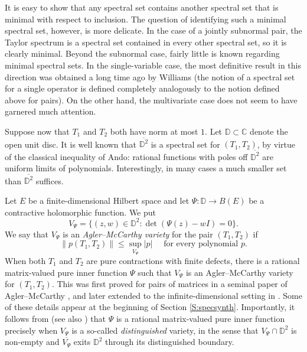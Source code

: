\documentclass[10pt]{amsart}
\newcommand{\bC}{{\mathbb{C}}}
\newcommand{\bD}{{\mathbb{D}}}
\newcommand{\ol}{\overline}
\theoremstyle{definition}
\begin{document}
It is easy to show that any spectral set contains another spectral set that is minimal with respect to inclusion. The question of identifying such a minimal spectral set, however, is more delicate. In the case of a jointly subnormal pair, the Taylor spectrum is a spectral set \cite{putinar1984} contained in every other spectral set, so it is clearly minimal. Beyond the subnormal case, fairly little is known regarding minimal spectral sets. In the single-variable case, the most definitive result in this direction was obtained a long time ago by Williams \cite{williams1967} (the notion of a spectral set for a single operator is defined completely analogously to the notion defined above for pairs). On the other hand, the multivariate case does not seem to have garnered much attention. 

Suppose now that $T_1$ and $T_2$ both  have norm at most $1$. Let $\bD\subset \bC$ denote the open unit disc. It is well known that $\ol{\bD^2}$ is a spectral set for $(T_1,T_2)$, by virtue of the classical inequality of Ando: rational functions with poles off $\ol{\bD^2}$ are uniform limits of polynomials. Interestingly, in many cases a much smaller set than $\ol{\bD^2}$ suffices.

Let $E$ be a finite-dimensional Hilbert space and let $\Psi:\bD \to B(E)$ be a contractive holomorphic function. We put
\[
V_\Psi=\{(z,w)\in \bD^2:\det(\Psi(z)-wI)=0\}.
\]
We say that $V_\Psi$ is an \emph{Agler--McCarthy variety} for the pair $(T_1,T_2)$ if 
\begin{equation}\label{Eq:AM}
\|p(T_1,T_2)\|\leq \sup_{V_\Psi} |p| \quad \text{ for every polynomial } p.
\end{equation}
When both $T_1$ and $T_2$ are pure contractions with finite defects, there is a rational matrix-valued pure inner function $\Psi$ such that $V_\Psi$ is an Agler--McCarthy variety for $(T_1,T_2)$.  This was first proved for pairs of matrices in a seminal paper of Agler--McCarthy \cite[Theorem 3.1]{AM2005}, and later extended to the infinite-dimensional setting  in \cite[Theorem 4.3]{DS2017}. Some of these details appear at the beginning of Section \ref{S:specsynth}. Importantly, it follows from  \cite[Theorem 1.12]{AM2005} (see also \cite{BKS2022, knese2010}) that $\Psi$ is a rational matrix-valued pure inner function precisely when $V_\Psi$ is a so-called  \emph{distinguished} variety, in the sense that $V_\Psi\cap \bD^2$ is non-empty and $\ol{V_\Psi}$ exits $\bD^2$ through its distinguished boundary. 
\end{document}
